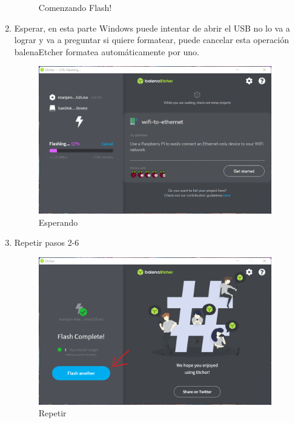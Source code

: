 \documentclass[stu, 12pt, letterpaper, donotrepeattitle, floatsintext, natbib, helv]{apa7}
\begin{document}
\begin{enumerate}
\begin{figure}[H]
        \caption{Comenzando Flash!}
        \label{fig:flashing}
    \end{figure}
    \item Esperar, en esta parte Windows puede intentar de abrir el USB no lo va a lograr y va a preguntar si quiere formatear, puede cancelar esta operación balenaEtcher formatea automáticamente por uno.
    \begin{figure}[H]
        \includegraphics[width = 0.96\textwidth]{Waiting.png}
        \caption{Esperando}
        \label{fig:waiting}
    \end{figure}
    \item Repetir pasos 2-6
    \begin{figure}[H]
        \includegraphics[width = 0.96\textwidth]{Repeat.png}
        \caption{Repetir}
        \label{fig:repeating}
    \end{figure}
\end{enumerate}

\end{document}
